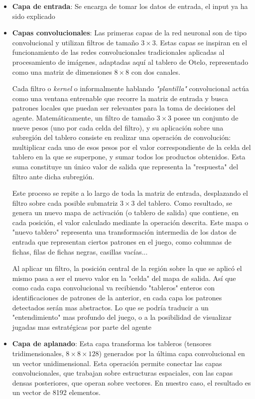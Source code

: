 \documentclass[conference]{IEEEtran}
\begin{document}
\begin{itemize}
    \item \textbf{Capa de entrada}: Se encarga de tomar los datos de entrada, el input ya ha sido explicado 
    \item \textbf{Capas convolucionales}\cite{rusin2020}: Las primeras capas de la red neuronal son de tipo convolucional y utilizan filtros de tamaño $3 \times 3$. Estas capas se inspiran en el funcionamiento de las redes convolucionales tradicionales aplicadas al procesamiento de imágenes, adaptadas aquí al tablero de Otelo, representado como una matriz de dimensiones $8 \times 8$ con dos canales.

Cada filtro o \textit{kernel} o informalmente hablando \textit{"plantilla"} convolucional actúa como una ventana entrenable que recorre la matriz de entrada y busca patrones locales que puedan ser relevantes para la toma de decisiones del agente. Matemáticamente, un filtro de tamaño $3 \times 3$ posee un conjunto de nueve pesos (uno por cada celda del filtro), y su aplicación sobre una subregión del tablero consiste en realizar una operación de convolución: multiplicar cada uno de esos pesos por el valor correspondiente de la celda del tablero en la que se superpone, y sumar todos los productos obtenidos. Esta suma constituye un único valor de salida que representa la "respuesta" del filtro ante dicha subregión.

Este proceso se repite a lo largo de toda la matriz de entrada, desplazando el filtro sobre cada posible submatriz $3 \times 3$ del tablero. Como resultado, se genera un nuevo mapa de activación (o tablero de salida) que contiene, en cada posición, el valor calculado mediante la operación descrita. Este mapa o "nuevo tablero" representa una transformación intermedia de los datos de entrada que representan ciertos patrones en el juego, como columnas de fichas, filas de fichas negras, casillas vacías...

 Al aplicar un filtro, la posición central de la región sobre la que se aplicó el mismo pasa a ser el nuevo valor en la "celda" del mapa de salida. Así que como cada capa convolucional va recibiendo "tableros" enteros con identificaciones de patrones de la anterior, en cada capa los patrones detectados serán mas abstractos. Lo que se podría traducir a un "entendimiento" mas profundo del juego, o a la posibilidad de visualizar jugadas mas estratégicas por parte del agente
\item \textbf{Capa de aplanado}\cite{rusin2020}: Esta capa transforma los tableros (tensores tridimensionales, $8 \times 8 \times 128$) generados por la última capa convolucional en un vector unidimensional. Esta operación permite conectar las capas convolucionales, que trabajan sobre estructuras espaciales, con las capas densas posteriores, que operan sobre vectores. En nuestro caso, el resultado es un vector de 8192 elementos.


\end{itemize}
\end{document}
